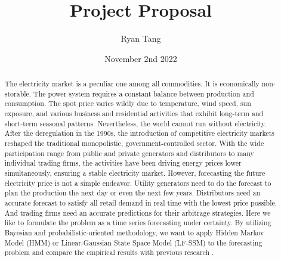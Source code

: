 \documentclass[11pt, letterpaper]{article}
\title{Project Proposal}
\author{Ryan Tang}
\date{November 2nd 2022}
\begin{document}
\maketitle

\begin{abstract}
    The electricity market is a peculiar one among all commodities. It is economically non-storable. The power system requires a constant balance between production and consumption. The spot price varies wildly due to temperature, wind speed, sun exposure, and various business and residential activities that exhibit long-term and short-term seasonal patterns. Nevertheless, the world cannot run without electricity. After the deregulation in the 1990s, the introduction of competitive electricity markets reshaped the traditional monopolistic, government-controlled sector. With the wide participation range from public and private generators and distributors to many individual trading firms, the activities have been driving energy prices lower simultaneously, ensuring a stable electricity market. However, forecasting the future electricity price is not a simple endeavor. Utility generators need to do the forecast to plan the production the next day or even the next few years. Distributors need an accurate forecast to satisfy all retail demand in real time with the lowest price possible. And trading firms need an accurate predictions for their arbitrage strategies. Here we like to formulate the problem as a time series forecasting under certainty. By utilizing Bayesian and probabilistic-oriented methodology, we want to apply Hidden Markov Model (HMM) or Linear-Gaussian State Space Model (LF-SSM) to the forecasting problem and compare the empirical results with previous research \cite{Nowotarski}.

\end{abstract}

\printbibliography[heading=bibintoc, title={References}]
\end{document}
